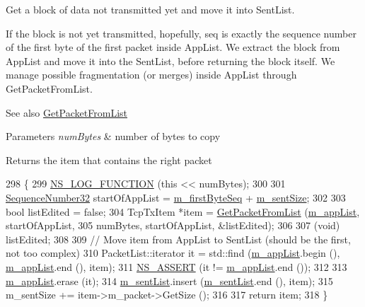 Get a block of data not transmitted yet and move it into Sent\+List. 

If the block is not yet transmitted, hopefully, seq is exactly the sequence number of the first byte of the first packet inside App\+List. We extract the block from App\+List and move it into the Sent\+List, before returning the block itself. We manage possible fragmentation (or merges) inside App\+List through Get\+Packet\+From\+List.

\begin{DoxySeeAlso}{See also}
\hyperlink{classns3_1_1TcpTxBuffer_a0528a0261fe39fdb95526c24801f1091}{Get\+Packet\+From\+List} 
\end{DoxySeeAlso}

\begin{DoxyParams}{Parameters}
{\em num\+Bytes} & number of bytes to copy\\
\hline
\end{DoxyParams}
\begin{DoxyReturn}{Returns}
the item that contains the right packet 
\end{DoxyReturn}

\begin{DoxyCode}
298 \{
299   \hyperlink{log-macros-disabled_8h_a90b90d5bad1f39cb1b64923ea94c0761}{NS\_LOG\_FUNCTION} (\textcolor{keyword}{this} << numBytes);
300 
301   \hyperlink{group__network_gacb2070e4e98d2d5135c9bede58f07a03}{SequenceNumber32} startOfAppList = \hyperlink{classns3_1_1TcpTxBuffer_a46b67e5cb3396b43a41dd3fd5b135346}{m\_firstByteSeq} + 
      \hyperlink{classns3_1_1TcpTxBuffer_ae45302ec0a3b3d757b0f3ad85e88e363}{m\_sentSize};
302 
303   \textcolor{keywordtype}{bool} listEdited = \textcolor{keyword}{false};
304   TcpTxItem *item = \hyperlink{classns3_1_1TcpTxBuffer_a0528a0261fe39fdb95526c24801f1091}{GetPacketFromList} (\hyperlink{classns3_1_1TcpTxBuffer_ac85673c102b50188282a70152cc542ca}{m\_appList}, startOfAppList,
305                                        numBytes, startOfAppList, &listEdited);
306 
307   (void) listEdited;
308 
309   \textcolor{comment}{// Move item from AppList to SentList (should be the first, not too complex)}
310   PacketList::iterator it = std::find (\hyperlink{classns3_1_1TcpTxBuffer_ac85673c102b50188282a70152cc542ca}{m\_appList}.begin (), \hyperlink{classns3_1_1TcpTxBuffer_ac85673c102b50188282a70152cc542ca}{m\_appList}.end (), item);
311   \hyperlink{assert_8h_a6dccdb0de9b252f60088ce281c49d052}{NS\_ASSERT} (it != \hyperlink{classns3_1_1TcpTxBuffer_ac85673c102b50188282a70152cc542ca}{m\_appList}.end ());
312 
313   \hyperlink{classns3_1_1TcpTxBuffer_ac85673c102b50188282a70152cc542ca}{m\_appList}.erase (it);
314   \hyperlink{classns3_1_1TcpTxBuffer_ae131f4743f4537f3606db664874440e5}{m\_sentList}.insert (\hyperlink{classns3_1_1TcpTxBuffer_ae131f4743f4537f3606db664874440e5}{m\_sentList}.end (), item);
315   m\_sentSize += item->m\_packet->GetSize ();
316 
317   \textcolor{keywordflow}{return} item;
318 \}
\end{DoxyCode}


